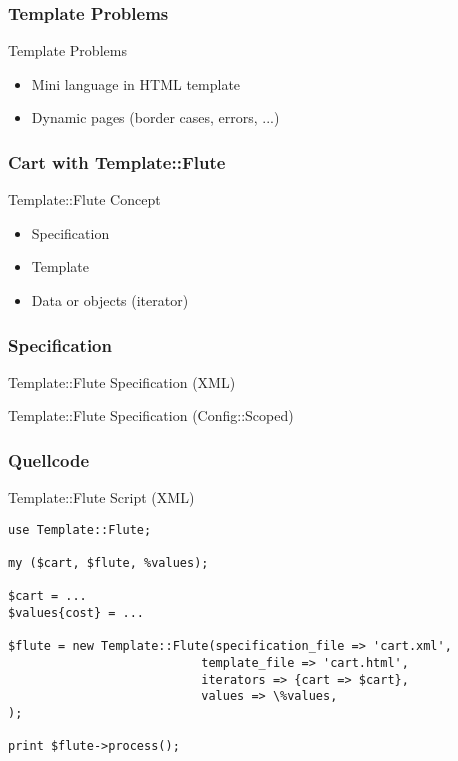 \subsubsection{Template Problems}
\begin{frame}{Template Problems}
 \begin{itemize}
  \item Mini language in HTML template
  \item Dynamic pages (border cases, errors, ...)
 \end{itemize}
\end{frame}
\subsubsection{Cart with Template::Flute}
\begin{frame}{Template::Flute Concept}
 \begin{itemize}
  \item Specification
  \item Template
  \item Data or objects (iterator)
 \end{itemize}
\end{frame}
\subsubsection{Specification}
\begin{frame}[fragile]{Template::Flute Specification (XML)}

\end{frame}
\begin{frame}[fragile]{Template::Flute Specification (Config::Scoped)}

\end{frame}
\subsubsection{Quellcode}
\begin{frame}[fragile]{Template::Flute Script (XML)}
\begin{lstlisting}
use Template::Flute;

my ($cart, $flute, %values);

$cart = ...
$values{cost} = ...

$flute = new Template::Flute(specification_file => 'cart.xml',
                           template_file => 'cart.html',
                           iterators => {cart => $cart},
                           values => \%values,
);

print $flute->process();
\end{lstlisting}
\end{frame}

